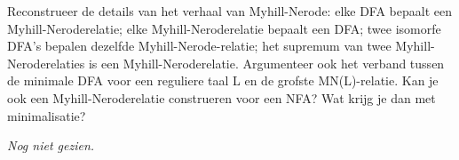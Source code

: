 \begin{question}
Reconstrueer de details van het verhaal van Myhill-Nerode: elke DFA bepaalt een Myhill-Neroderelatie; elke Myhill-Neroderelatie bepaalt een DFA; twee isomorfe DFA's bepalen dezelfde Myhill-Nerode-relatie; het supremum van twee Myhill-Neroderelaties is een Myhill-Neroderelatie.
Argumenteer ook het verband tussen de minimale DFA voor een reguliere taal L en de grofste MN(L)-relatie.
Kan je ook een Myhill-Neroderelatie construeren voor een NFA? Wat krijg je dan met minimalisatie?
\end{question}

\textit{Nog niet gezien.}